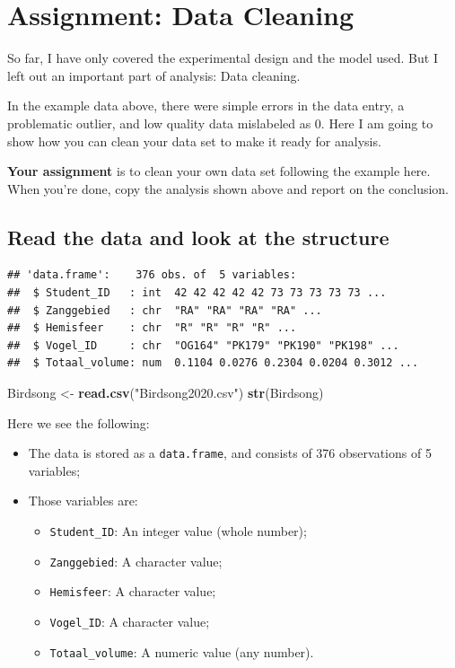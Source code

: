 \documentclass[
]{book}
\newenvironment{Shaded}{\begin{snugshade}}{\end{snugshade}}
\newcommand{\KeywordTok}[1]{\textcolor[rgb]{0.13,0.29,0.53}{\textbf{#1}}}
\newcommand{\NormalTok}[1]{#1}
\newcommand{\StringTok}[1]{\textcolor[rgb]{0.31,0.60,0.02}{#1}}
\providecommand{\tightlist}{%
  \setlength{\itemsep}{0pt}\setlength{\parskip}{0pt}}
\begin{document}
\hypertarget{assignment-data-cleaning}{%
\section{Assignment: Data Cleaning}\label{assignment-data-cleaning}}

So far, I have only covered the experimental design and the model used. But I left out an important part of analysis: Data cleaning.

In the example data above, there were simple errors in the data entry, a problematic outlier, and low quality data mislabeled as \(0\). Here I am going to show how you can clean your data set to make it ready for analysis.

\textbf{Your assignment} is to clean your own data set following the example here. When you're done, copy the analysis shown above and report on the conclusion.

\hypertarget{read-the-data-and-look-at-the-structure}{%
\subsection{Read the data and look at the structure}\label{read-the-data-and-look-at-the-structure}}

\begin{verbatim}
## 'data.frame':    376 obs. of  5 variables:
##  $ Student_ID   : int  42 42 42 42 42 73 73 73 73 73 ...
##  $ Zanggebied   : chr  "RA" "RA" "RA" "RA" ...
##  $ Hemisfeer    : chr  "R" "R" "R" "R" ...
##  $ Vogel_ID     : chr  "OG164" "PK179" "PK190" "PK198" ...
##  $ Totaal_volume: num  0.1104 0.0276 0.2304 0.0204 0.3012 ...
\end{verbatim}

\begin{Shaded}
\begin{Highlighting}[]
\NormalTok{Birdsong <-}\StringTok{ }\KeywordTok{read.csv}\NormalTok{(}\StringTok{"Birdsong2020.csv"}\NormalTok{)}
\KeywordTok{str}\NormalTok{(Birdsong)}
\end{Highlighting}
\end{Shaded}

Here we see the following:

\begin{itemize}
\tightlist
\item
  The data is stored as a \texttt{data.frame}, and consists of 376 observations of 5 variables;
\item
  Those variables are:

  \begin{itemize}
  \tightlist
  \item
    \texttt{Student\_ID}: An integer value (whole number);
  \item
    \texttt{Zanggebied}: A character value;
  \item
    \texttt{Hemisfeer}: A character value;
  \item
    \texttt{Vogel\_ID}: A character value;
  \item
    \texttt{Totaal\_volume}: A numeric value (any number).
  \end{itemize}
\end{itemize}
\end{document}
